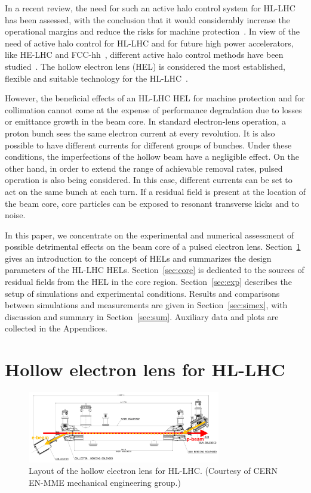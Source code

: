 \documentclass[%
 reprint,
 amsmath,amssymb,
 aps,
prstab,
longbibliography,
]{revtex4-1}
\begin{document}
In a recent review, the need for such an active halo control system
for HL-LHC has been assessed, with the conclusion that it would
considerably increase the operational margins and reduce the risks for
machine protection~\cite{helreview}. In view of the need of active
halo control for HL-LHC and for future high power accelerators, like
HE-LHC and FCC-hh~\cite{helhcparam2011, fcc_coll_ipac2017}, different
active halo control methods have been
studied~\cite{helreview_bruce}. The hollow electron lens (HEL) is
considered the most established, flexible and suitable technology for
the HL-LHC~\cite{hel_tevatron_stancari, helreview}.

However, the beneficial effects of an HL-LHC HEL for machine
protection and for collimation cannot come at the expense of
performance degradation due to losses or emittance growth in the beam
core. In standard electron-lens operation, a proton bunch sees the
same electron current at every revolution. It is also possible to have
different currents for different groups of bunches. Under these
conditions, the imperfections of the hollow beam have a negligible
effect. On the other hand, in order to extend the range of achievable
removal rates, pulsed operation is also being considered. In this
case, different currents can be set to act on the same bunch at each
turn. If a residual field is present at the location of the beam core,
core particles can be exposed to resonant transverse kicks and to
noise.

In this paper, we concentrate on the experimental and numerical
assessment of possible detrimental effects on the beam core of a
pulsed electron lens. Section~\ref{sec:hel} gives an introduction to
the concept of HELs and summarizes the design parameters of the HL-LHC
HELs. Section~\ref{sec:core} is dedicated to the sources of residual
fields from the HEL in the core region. Section~\ref{sec:exp}
describes the setup of simulations and experimental
conditions. Results and comparisons between simulations and
measurements are given in Section~\ref{sec:simex}, with discussion and
summary in Section~\ref{sec:sum}. Auxiliary data and plots are
collected in the Appendices.



\section{Hollow electron lens for HL-LHC}
\label{sec:hel}

\begin{figure}
  \includegraphics[width=0.75\textwidth]{hel_layout_epbeam}
  \caption{Layout of the hollow electron lens for HL-LHC. (Courtesy of
    CERN EN-MME mechanical engineering group.)}
  \label{fig:hel_layout}
\end{figure}
\end{document}
